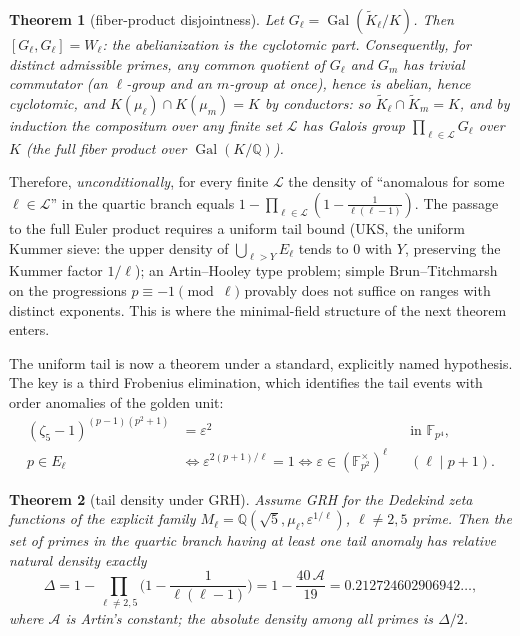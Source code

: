 \documentclass[11pt]{amsart}
\newtheorem{theorem}{Theorem}[section]
\theoremstyle{definition}
\theoremstyle{remark}
\newcommand{\F}{\mathbb{F}}
\newcommand{\Q}{\mathbb{Q}}
\newcommand{\eps}{\varepsilon}
\newcommand{\Gal}{\operatorname{Gal}}
\begin{document}
\begin{theorem}[fiber-product disjointness]\label{thm:fpd}
Let $G_\ell = \Gal(\widetilde K_\ell/K)$. Then
$[G_\ell, G_\ell] = W_\ell$: the abelianization is the cyclotomic part.
Consequently, for distinct admissible primes, any common quotient of
$G_\ell$ and $G_m$ has trivial commutator (an $\ell$-group and an
$m$-group at once), hence is abelian, hence cyclotomic, and
$K(\mu_\ell) \cap K(\mu_m) = K$ by conductors: so
$\widetilde K_\ell \cap \widetilde K_m = K$, and by induction the
compositum over any finite set $\mathcal L$ has Galois group
$\prod_{\ell \in \mathcal L} G_\ell$ over $K$ (the full fiber product
over $\Gal(K/\Q)$).
\end{theorem}

Therefore, \emph{unconditionally}, for every finite $\mathcal L$ the
density of ``anomalous for some $\ell \in \mathcal L$'' in the quartic
branch equals $1 - \prod_{\ell \in \mathcal L}(1 - \tfrac1{\ell(\ell-1)})$.
The passage to the full Euler product requires a uniform tail bound
(UKS, the uniform Kummer sieve: the upper density of
$\bigcup_{\ell > Y} E_\ell$ tends to $0$ with $Y$, preserving the Kummer
factor $1/\ell$); an Artin--Hooley type problem; simple
Brun--Titchmarsh on the progressions $p \equiv -1 \pmod \ell$ provably
does not suffice on ranges with distinct exponents. This is where the
minimal-field structure of the next theorem enters.

The uniform tail is now a theorem under a standard, explicitly named
hypothesis. The key is a third Frobenius elimination, which identifies
the tail events with order anomalies of the golden unit:
\[
\begin{aligned}
(\zeta_5 - 1)^{(p-1)(p^2+1)}
  &= \eps^2 &&\text{in }\F_{p^4},\\
p \in E_\ell
  &\iff \eps^{2(p+1)/\ell}=1
   \iff \eps\in(\F_{p^2}^{\times})^\ell
  &&(\ell\mid p+1).
\end{aligned}
\]

\begin{theorem}[tail density under GRH]\label{thm:uks}
Assume GRH for the Dedekind zeta functions of the explicit family
$M_\ell = \Q(\sqrt5, \mu_\ell, \eps^{1/\ell})$, $\ell \ne 2,5$ prime.
Then the set of primes in the quartic branch having at least one tail
anomaly has relative natural density exactly
\[
\Delta
= 1 - \prod_{\ell \ne 2,5}\Big(1 - \frac{1}{\ell(\ell-1)}\Big)
= 1 - \frac{40\,\mathcal A}{19}
= 0.212724602906942\ldots,
\]
where $\mathcal A$ is Artin's constant; the absolute density among all
primes is $\Delta/2$.
\end{theorem}
\end{document}
